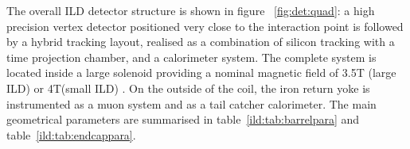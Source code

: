 The overall ILD detector structure is shown in figure ~\ref{fig:det:quad}: a high precision vertex detector positioned very close to the interaction point is followed by a hybrid tracking layout, realised as a combination of silicon tracking with a time projection chamber, and a calorimeter system. The complete system is located inside a large solenoid providing a nominal magnetic field of 3.5T (large ILD) or 4T(small ILD) . On the outside of the coil, the iron return yoke is instrumented as a muon system and as a tail catcher calorimeter. 
The main geometrical parameters are summarised in table~\ref{ild:tab:barrelpara} and table~\ref{ild:tab:endcappara}.
%
%
